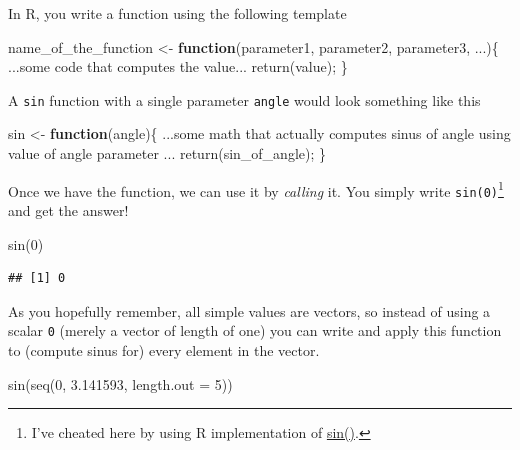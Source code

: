 \documentclass[
]{book}
\newenvironment{Shaded}{\begin{snugshade}}{\end{snugshade}}
\newcommand{\AttributeTok}[1]{\textcolor[rgb]{0.77,0.63,0.00}{#1}}
\newcommand{\ControlFlowTok}[1]{\textcolor[rgb]{0.13,0.29,0.53}{\textbf{#1}}}
\newcommand{\DecValTok}[1]{\textcolor[rgb]{0.00,0.00,0.81}{#1}}
\newcommand{\FloatTok}[1]{\textcolor[rgb]{0.00,0.00,0.81}{#1}}
\newcommand{\FunctionTok}[1]{\textcolor[rgb]{0.00,0.00,0.00}{#1}}
\newcommand{\NormalTok}[1]{#1}
\newcommand{\OtherTok}[1]{\textcolor[rgb]{0.56,0.35,0.01}{#1}}
\begin{document}
In R, you write a function using the following template

\begin{Shaded}
\begin{Highlighting}[]
\NormalTok{name\_of\_the\_function }\OtherTok{\textless{}{-}} \ControlFlowTok{function}\NormalTok{(parameter1, parameter2, parameter3, ...)\{}
\NormalTok{  ...some code that computes the value...}
  \FunctionTok{return}\NormalTok{(value);}
\NormalTok{\}}
\end{Highlighting}
\end{Shaded}

A \texttt{sin} function with a single parameter \texttt{angle} would look something like this

\begin{Shaded}
\begin{Highlighting}[]
\NormalTok{sin }\OtherTok{\textless{}{-}} \ControlFlowTok{function}\NormalTok{(angle)\{}
\NormalTok{  ...some math that actually computes sinus of angle using value of angle parameter ...}
  \FunctionTok{return}\NormalTok{(sin\_of\_angle);}
\NormalTok{\}}
\end{Highlighting}
\end{Shaded}

Once we have the function, we can use it by \emph{calling} it. You simply write \texttt{sin(0)}\footnote{I've cheated here by using R implementation of \href{https://stat.ethz.ch/R-manual/R-devel/library/base/html/Trig.html}{sin()}.} and get the answer!

\begin{Shaded}
\begin{Highlighting}[]
\FunctionTok{sin}\NormalTok{(}\DecValTok{0}\NormalTok{)}
\end{Highlighting}
\end{Shaded}

\begin{verbatim}
## [1] 0
\end{verbatim}

As you hopefully remember, all simple values are vectors, so instead of using a scalar \texttt{0} (merely a vector of length of one) you can write and apply this function to (compute sinus for) every element in the vector.

\begin{Shaded}
\begin{Highlighting}[]
\FunctionTok{sin}\NormalTok{(}\FunctionTok{seq}\NormalTok{(}\DecValTok{0}\NormalTok{, }\FloatTok{3.141593}\NormalTok{, }\AttributeTok{length.out =} \DecValTok{5}\NormalTok{))}
\end{Highlighting}
\end{Shaded}
\end{document}
